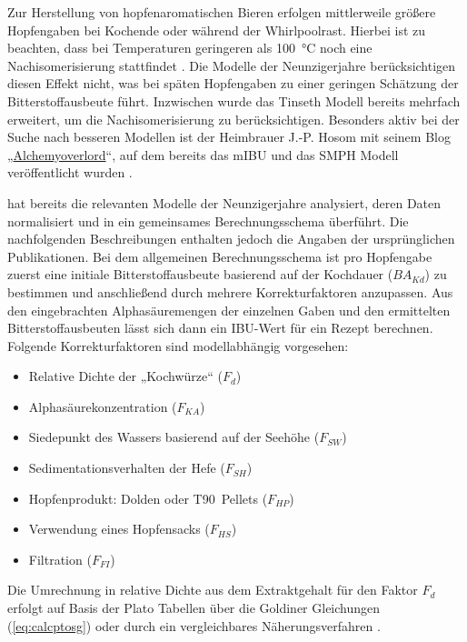 \documentclass[a4paper,parskip=half]{scrartcl}
\newcommand{\BAKt}{{\mathit{BA}}_{\mathit{Kd}}}
\newcommand{\FKd}{F_{\mathit{d}}}
\newcommand{\FHR}{F_{\mathit{KA}}}
\newcommand{\FSP}{F_{\mathit{SW}}}
\newcommand{\FAH}{F_{\mathit{SH}}}
\newcommand{\FHF}{F_{\mathit{HP}}}
\newcommand{\FHS}{F_{\mathit{HS}}}
\newcommand{\FFil}{F_{\mathit{FI}}}
\begin{document}
Zur Herstellung von hopfenaromatischen Bieren erfolgen mittlerweile größere Hopfengaben bei Kochende oder während der Whirlpoolrast. Hierbei ist zu beachten, dass bei Temperaturen geringeren als 100~°C noch eine Nachisomerisierung stattfindet \parencite{Weiss2019}. Die Modelle der Neunzigerjahre berücksichtigen diesen Effekt nicht, was bei späten Hopfengaben zu einer geringen Schätzung der Bitterstoffausbeute führt. Inzwischen wurde das Tinseth Modell bereits mehrfach erweitert, um die Nachisomerisierung zu berücksichtigen. Besonders aktiv bei der Suche nach besseren Modellen ist der Heimbrauer J.-P. Hosom mit seinem Blog „\href{https://jphosom.github.io/alchemyoverlord}{Alchemyoverlord}“, auf dem bereits das mIBU und das SMPH Modell veröffentlicht wurden \parencites{Hosom2015}{Hosom2021}.

\textcite{Hall1997} hat bereits die relevanten Modelle der Neunzigerjahre analysiert, deren Daten normalisiert und in ein gemeinsames Berechnungsschema überführt. Die nachfolgenden Beschreibungen enthalten jedoch die Angaben der ursprünglichen Publikationen. Bei dem allgemeinen Berechnungsschema ist pro Hopfengabe zuerst eine initiale Bitterstoffausbeute basierend auf der Kochdauer ($\BAKt$) zu bestimmen und anschließend durch mehrere Korrekturfaktoren anzupassen. Aus den eingebrachten Alphasäuremengen der einzelnen Gaben und den ermittelten Bitterstoffausbeuten lässt sich dann ein IBU-Wert für ein Rezept berechnen. Folgende Korrekturfaktoren sind modellabhängig vorgesehen:

\begin{itemize}
\item Relative Dichte der „Kochwürze“ ($\FKd$)
\item Alphasäurekonzentration ($\FHR$)
\item Siedepunkt des Wassers basierend auf der Seehöhe ($\FSP$)
\item Sedimentationsverhalten der Hefe ($\FAH$)
\item Hopfenprodukt: Dolden oder T90~Pellets ($\FHF$)
\item Verwendung eines Hopfensacks ($\FHS$)
\item Filtration ($\FFil$)
\end{itemize}

Die Umrechnung in relative Dichte aus dem Extraktgehalt für den Faktor $\FKd$  erfolgt auf Basis der Plato Tabellen über die Goldiner Gleichungen (\autoref{eq:calcptosg}) oder durch ein vergleichbares Näherungsverfahren \parencite[140\psq]{Spedding2016}.
\end{document}
